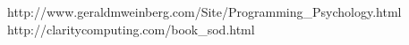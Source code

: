 \begin{center}
                      {http://www.geraldmweinberg.com/Site/Programming_Psychology.html}
                      {http://claritycomputing.com/book_sod.html}

\end{center}
